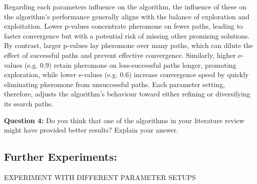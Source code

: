 \documentclass[sigconf]{acmart}
\begin{document}
            Regarding each parameters influence on the algorithm, the influence of these on the algorithm’s performance generally aligns with the balance of exploration and exploitation. Lower p-values concentrate pheromone on fewer paths, leading to faster convergence but with a potential risk of missing other promising solutions. By contrast, larger p-values lay pheromone over many paths, which can dilute the effect of successful paths and prevent effective convergence. Similarly, higher e-values (e.g. 0.9) retain pheromone on less-successful paths longer, promoting exploration, while lower e-values (e.g. 0.6) increase convergence speed by quickly eliminating pheromone from unsuccessful paths. Each parameter setting, therefore, adjusts the algorithm’s behaviour toward either refining or diversifying its search paths.\newline

            \textbf{Question 4:} Do you think that one of the algorithms in your literature review might have provided better results? Explain your answer.\newline

        \subsection{Further Experiments:}                
            EXPERIMENT WITH DIFFERENT PARAMETER SETUPS
    
    \printbibliography
\end{document}
